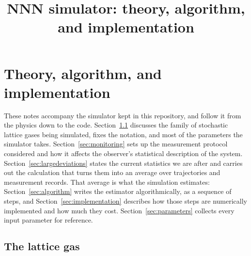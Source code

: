 \documentclass[11pt]{article}
\title{NNN simulator: theory, algorithm, and implementation}
\author{}
\date{}
\DeclareMathOperator{\Tr}{Tr}
\begin{document}
\maketitle
\tableofcontents

\section{Theory, algorithm, and implementation}

%



These notes accompany the simulator kept in this repository, and follow it from the physics down to the code. Section~\ref{sec:simulated-model} discusses the family of stochastic lattice gases being simulated, fixes the notation, and most of the parameters the simulator takes. Section~\ref{sec:monitoring} sets up the measurement protocol considered and how it affects the observer's statistical description of the system. Section~\ref{sec:largedeviations} states the current statistics we are after and carries out the calculation that turns them into an average over trajectories and measurement records. That average is what the simulation estimates: Section~\ref{sec:algorithm} writes the estimator algorithmically, as a sequence of steps, and Section~\ref{sec:implementation} describes how those steps are numerically implemented and how much they cost. Section~\ref{sec:parameters} collects every input parameter for reference.

\subsection{The lattice gas}
\label{sec:simulated-model}
\end{document}
